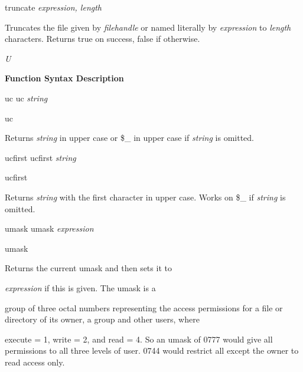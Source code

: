 \documentclass[a4paper,11pt]{book}
\begin{document}
\noindent 

\noindent truncate \textit{expression, length}

\noindent 

\noindent Truncates the file given by \textit{filehandle }or named literally by \textit{expression }to \textit{length }characters. Returns true on success, false if otherwise.

\noindent 

\noindent 

\noindent 

\noindent \textit{U}

\noindent 

\noindent \textbf{Function Syntax Description}

\noindent 

\noindent uc uc \textit{string}

\noindent 

\noindent uc

\noindent 

\noindent Returns \textit{string }in upper case or \$\_ in upper case if \textit{string }is omitted.

\noindent 

\noindent 

\noindent ucfirst ucfirst \textit{string}

\noindent 

\noindent ucfirst

\noindent Returns \textit{string }with the first character in upper case. Works on \$\_ if \textit{string }is omitted.

\noindent 

\noindent 

\noindent umask umask \textit{expression}

\noindent 

\noindent umask

\noindent Returns the current umask and then sets it to

\noindent \textit{expression }if this is given. The umask is a

\noindent group of three octal numbers representing the access permissions for a file or directory of its owner, a group and other users, where

\noindent execute = 1, write = 2, and read = 4. So an umask of 0777 would give all permissions to all three levels of user. 0744 would restrict all except the owner to read access only.

\noindent 
\end{document}
